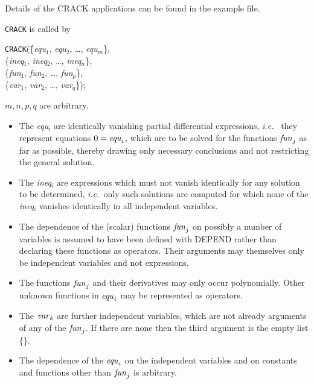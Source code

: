 \documentclass[11pt,letterpaper]{book}
\begin{document}

Details of the CRACK applications can be found in the example file.

{\tt CRACK} is called by
\begin{tabbing}
  {\tt CRACK}(\=\{{\it equ}$_1$, {\it equ}$_2$, \ldots , {\it equ}$_m$\},  \\
              \>\{{\it ineq}$_1$, {\it ineq}$_2$, \ldots , {\it ineq}$_n$\}, \\
              \>\{{\it fun}$_1$, {\it fun}$_2$, \ldots , {\it fun}$_p$\},  \\
              \>\{{\it var}$_1$, {\it var}$_2$, \ldots , {\it var}$_q$\});
\end{tabbing}
        $m,n,p,q$ are arbitrary.
\begin{itemize}
\item
The {\it equ}$_i$ are identically vanishing partial differential expressions,
{\em i.e.\ }
they represent equations  $0 = {\it equ}_i$, which are to be solved for the
functions ${\it fun}_j$ as far as possible, thereby drawing only necessary
conclusions and not restricting the general solution.
\item
The {\it ineq}$_i$ are expressions which must not vanish identically for
any solution to be determined, {\em i.e.\ }only such solutions are
computed for which none of the {\it ineq}$_i$ vanishes identically in
all independent variables.
\item
The dependence of the (scalar) functions ${\it fun}_j$ on possibly a
number of variables is assumed to have been defined with DEPEND rather
than declaring these functions as operators.  Their arguments may
themselves only be independent variables and not expressions.
\item
The functions ${\it fun}_j$ and their derivatives may only occur
polynomially.  Other unknown functions in ${\it equ}_i$ may be
represented as operators.
\item
The ${\it var}_k$ are further independent variables, which are not
already arguments of any of the ${\it fun}_j$.  If there are none then
the third argument is the empty list \{\}.
\item
The dependence of the ${\it equ}_i$ on the independent variables and on
constants and functions other than ${\it fun}_j$ is arbitrary.
\end{itemize}
\end{document}
